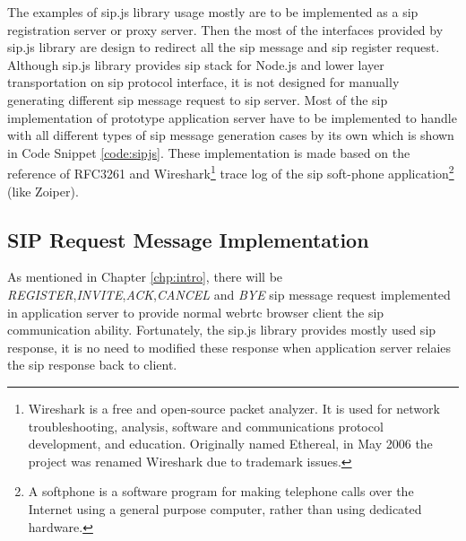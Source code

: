 \par The examples of sip.js library usage mostly are to be implemented as a \gls{sip} registration server or proxy server. Then the most of the interfaces provided by sip.js library are design to redirect all the \gls{sip} message and \gls{sip} register request. Although sip.js library provides \gls{sip} stack for Node.js and lower layer transportation on \gls{sip} protocol interface, it is not designed for manually generating different \gls{sip} message request to \gls{sip} server. Most of the \gls{sip} implementation of prototype application server have to be implemented to handle with all different types of \gls{sip} message generation cases by its own which is shown in Code Snippet \ref{code:sipjs}. These implementation is made based on the reference of RFC3261 and Wireshark\footnote{Wireshark is a free and open-source packet analyzer. It is used for network troubleshooting, analysis, software and communications protocol development, and education. Originally named Ethereal, in May 2006 the project was renamed Wireshark due to trademark issues.\cite{wiki:wireshark}} trace log of the \gls{sip} soft-phone application\footnote{A softphone is a software program for making telephone calls over the Internet using a general purpose computer, rather than using dedicated hardware.\cite{wiki:softphone}} (like Zoiper).

\subsection{SIP Request Message Implementation}

\par As mentioned in Chapter \ref{chp:intro}, there will be \textit{REGISTER},\textit{INVITE},\textit{ACK},\textit{CANCEL} and \textit{BYE} \gls{sip} message request implemented in application server to provide normal \gls{webrtc} browser client the \gls{sip} communication ability. Fortunately, the sip.js library provides mostly used \gls{sip} response, it is no need to modified these response when application server relaies the \gls{sip} response back to client.

